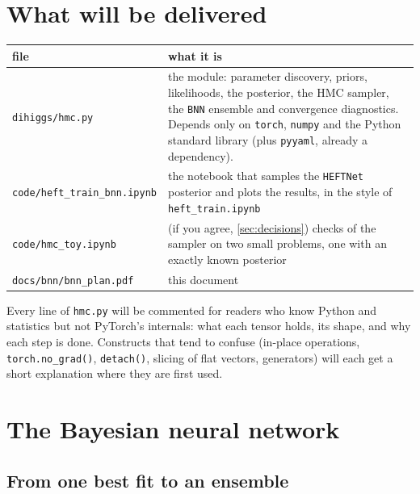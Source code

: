 \documentclass[11pt]{article}
\newcommand{\file}[1]{\nolinkurl{#1}}
\newcommand{\code}[1]{\texttt{#1}}
\begin{document}
\tableofcontents

\section{What will be delivered}
\label{sec:deliver}

\begin{center}
\small
\begin{tabular}{p{}p{}}
\toprule
file & what it is\\
\midrule
\file{dihiggs/hmc.py} & the module: parameter discovery, priors, likelihoods,
  the posterior, the HMC sampler, the \code{BNN} ensemble and convergence
  diagnostics. Depends only on \code{torch}, \code{numpy} and the Python standard
  library (plus \code{pyyaml}, already a dependency).\\
\file{code/heft_train_bnn.ipynb} & the notebook that samples the \code{HEFTNet}
  posterior and plots the results, in the style of \file{heft_train.ipynb}\\
\file{code/hmc_toy.ipynb} & (if you agree, \cref{sec:decisions}) checks of the
  sampler on two small problems, one with an exactly known posterior\\
\file{docs/bnn/bnn_plan.pdf} & this document\\
\bottomrule
\end{tabular}
\end{center}

\noindent Every line of \file{hmc.py} will be commented for readers who know
Python and statistics but not PyTorch's internals: what each tensor holds, its
shape, and why each step is done. Constructs that tend to confuse (in-place
operations, \code{torch.no\_grad()}, \code{detach()}, slicing of flat vectors,
generators) will each get a short explanation where they are first used.

\section{The Bayesian neural network}
\label{sec:bnn}

\subsection{From one best fit to an ensemble}
\end{document}

